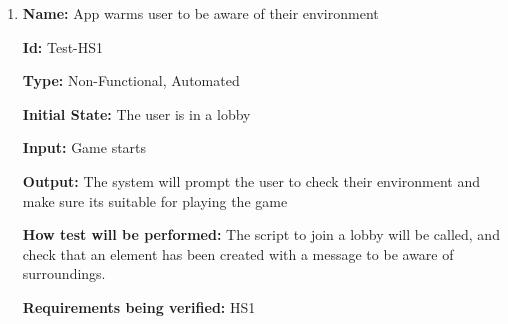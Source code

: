 \documentclass[12pt, titlepage]{article}
\begin{document}
\begin{enumerate}

\item{\textbf{Name:} App warms user to be aware of their environment}

\textbf{Id:} Test-HS1

\textbf{Type:} Non-Functional, Automated
					
\textbf{Initial State:} The user is in a lobby
					
\textbf{Input:} Game starts
					
\textbf{Output:} The system will prompt the user to check their environment and make sure its suitable for playing the game
					
\textbf{How test will be performed:} The script to join a lobby will be called, and check that an element has been created with a message to be aware of surroundings. 

\textbf{Requirements being verified:} HS1
\end{enumerate}
\end{document}
